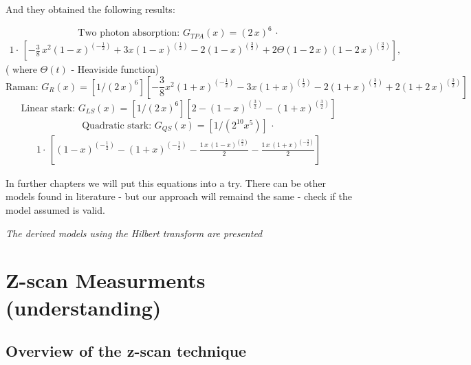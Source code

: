 \documentclass[12pt,twoside,a4paper]{article}
\numberwithin{equation}{subsection}
\numberwithin{figure}{subsection}
\begin{document}
And they obtained the following results:

\begin{equation} \label{eq:dother_tpa}
  \mbox{Two photon absorption: } {G_{TPA}}(x) = (2\,x)^{6}\,\cdot
\end{equation}
\begin{alignat*}{1}
  \cdot\,[-\frac {3}{8}\,x^{2}(1 - x)^{( - \frac {1}{2})} + 3x(1 - x)^{(\frac
  {1}{2})} - 2(1 - x)^{(\frac {3}{2})} + 2\Theta (1 - 2\,x)(1 - 2\,x)^{(\frac {3}{2})}], 
\end{alignat*}
( where $\Theta (t)$ - Heaviside function)
\begin{equation} \label{eq:dother_raman}
  \mbox{Raman: } {G_{R}}(x) = [1/(2\,x)^{6}][-\frac {3}{8}x^{2}(1 + x)^{( - \frac {1}{2})} - 3x(1 + x)^{(\frac {1}{2})}-2(1 +
  x)^{(\frac {3}{2})}+2(1 + 2\,x)^{(\frac {3}{2})}]
\end{equation}
\begin{equation} \label{eq:dother_lstark}
  \mbox{Linear stark: } {G_{LS}}(x) = [1/(2\,x)^{6}][2 - (1 - x)^{(\frac {3}{2})} - (1 + x)^{(\frac {3}{2})}]
\end{equation}
\begin{equation} \label{eq:dother_qstark}
  \mbox{Quadratic stark: } {G_{QS}}(x) = [1/(2^{10}x^{5})]\,\cdot
\end{equation}
\begin{alignat*}{1}
  \cdot\,[(1 - x)^{( - \frac {1}{2})} - (1 + x)^{( - \frac {1}{2})} - \frac {1\,x\,(1 - x)^{(\frac {3}{2})}}{2} - \frac {1\,x\,(1 +
  x) ^{( - \frac {3}{2})}}{2}]
\end{alignat*}

In further chapters we will put this equations into a try. There can be other models found in literature - but our approach will
remaind the same - check if the model assumed is valid.

\textit{The derived models using the Hilbert transform are presented}

\section{Z-scan Measurments (understanding)} \label{chap:zscan}

\subsection{Overview of the z-scan technique} \label{chap:zscan_overview}
\end{document}
